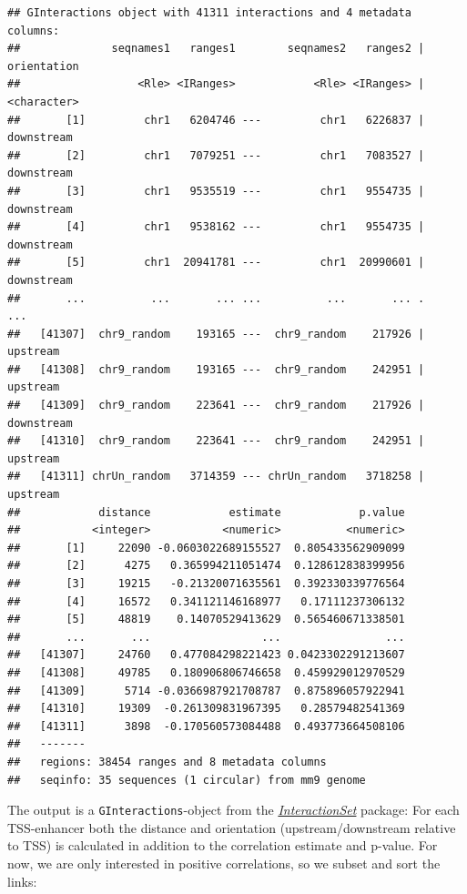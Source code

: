 \documentclass[9pt,a4paper,]{extarticle}
\begin{document}
\begin{verbatim}
## GInteractions object with 41311 interactions and 4 metadata columns:
##              seqnames1   ranges1        seqnames2   ranges2 | orientation
##                  <Rle> <IRanges>            <Rle> <IRanges> | <character>
##       [1]         chr1   6204746 ---         chr1   6226837 |  downstream
##       [2]         chr1   7079251 ---         chr1   7083527 |  downstream
##       [3]         chr1   9535519 ---         chr1   9554735 |  downstream
##       [4]         chr1   9538162 ---         chr1   9554735 |  downstream
##       [5]         chr1  20941781 ---         chr1  20990601 |  downstream
##       ...          ...       ... ...          ...       ... .         ...
##   [41307]  chr9_random    193165 ---  chr9_random    217926 |    upstream
##   [41308]  chr9_random    193165 ---  chr9_random    242951 |    upstream
##   [41309]  chr9_random    223641 ---  chr9_random    217926 |  downstream
##   [41310]  chr9_random    223641 ---  chr9_random    242951 |    upstream
##   [41311] chrUn_random   3714359 --- chrUn_random   3718258 |    upstream
##            distance            estimate            p.value
##           <integer>           <numeric>          <numeric>
##       [1]     22090 -0.0603022689155527  0.805433562909099
##       [2]      4275   0.365994211051474  0.128612838399956
##       [3]     19215   -0.21320071635561  0.392330339776564
##       [4]     16572   0.341121146168977   0.17111237306132
##       [5]     48819    0.14070529413629  0.565460671338501
##       ...       ...                 ...                ...
##   [41307]     24760   0.477084298221423 0.0423302291213607
##   [41308]     49785   0.180906806746658  0.459929012970529
##   [41309]      5714 -0.0366987921708787  0.875896057922941
##   [41310]     19309  -0.261309831967395   0.28579482541369
##   [41311]      3898  -0.170560573084488  0.493773664508106
##   -------
##   regions: 38454 ranges and 8 metadata columns
##   seqinfo: 35 sequences (1 circular) from mm9 genome
\end{verbatim}

The output is a \texttt{GInteractions}-object from the \emph{\href{https://bioconductor.org/packages/3.8/InteractionSet}{InteractionSet}} package\citep{Lun2016}: For each TSS-enhancer both the distance and orientation (upstream/downstream relative to TSS) is calculated in addition to the correlation estimate and p-value. For now, we are only interested in positive correlations, so we subset and sort the links:
\end{document}
